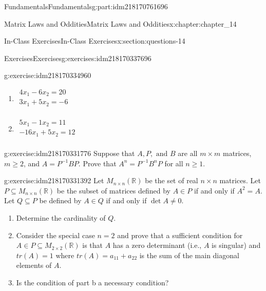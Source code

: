 \documentclass[oneside,10pt,]{book}
\numberwithin{equation}{section}
\begin{document}
\begin{partptx}{Fundamentals}{}{Fundamentals}{}{}{g:part:idm218170761696}
\begin{chapterptx}{Matrix Laws and Oddities}{}{Matrix Laws and Oddities}{}{}{x:chapter:chapter_14}
\begin{sectionptx}{In-Class Exercises}{}{In-Class Exercises}{}{}{x:section:questions-14}
\begin{exercises-subsection-numberless}{Exercises}{}{Exercises}{}{}{g:exercises:idm218170337696}
\begin{exercisegroup}
\begin{divisionexerciseeg}{2}{}{}{g:exercise:idm218170334960}
%
\begin{multicols}{2}
\begin{enumerate}[label=(\alph*)]
\item{}\(\displaystyle \begin{array}{c}4x_1-6x_2=20\\
3x_1+5x_2= -6\\
\end{array}\)%
\item{}\(\displaystyle \begin{array}{c}5x_1-1x_2= 11\\
-16x_1 +5x_2= 12\\
\end{array}\)%
\end{enumerate}
\end{multicols}
%
\end{divisionexerciseeg}%
\begin{divisionexerciseeg}{3}{}{}{g:exercise:idm218170331776}%
Suppose that \(A, P, \textrm{ and } B\) are all \(m \times m\) matrices, \(m \geq 2\), and \(A= P^{-1} B P\). Prove that  \(A^n = P^{-1} B^n P\) for all \(n \geq 1\).%
\end{divisionexerciseeg}%
\begin{divisionexerciseeg}{4}{}{}{g:exercise:idm218170331392}%
Let \(M_{n\times n}(\mathbb{R})\) be the set of real \(n\times n\) matrices. Let \(P \subseteq  M_{n\times n}(\mathbb{R})\) be the subset of matrices defined by \(A \in  P\) if and only if \(A^2 = A\). Let \(Q \subseteq  P\) be defined by \(A\in Q\) if and only if \(\det A \neq  0\).%
\par
%
\begin{enumerate}[label=(\alph*)]
\item{}Determine the cardinality of \(Q\).%
\item{}Consider the special case \(n = 2\) and prove that a sufficient condition for \(A \in  P \subseteq  M_{2\times 2}(\mathbb{R})\) is that \(A\) has a zero determinant (i.e., \(A\) is singular) and \(tr(A) = 1\) where \(tr(A) = a_{11}+ a _{22}\) is the sum of the main diagonal elements of \(A\).%
\item{}Is the condition of part b a necessary condition?%
\end{enumerate}
%
\end{divisionexerciseeg}%
\end{exercisegroup}
\par\medskip\noindent
\end{exercises-subsection-numberless}
\end{sectionptx}

\end{chapterptx}
\end{partptx}
\end{document}
